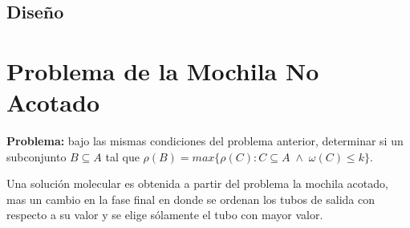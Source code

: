 \documentclass[12pt, letterpaper, twoside]{article}
\begin{document}
    \begin{algorithm}
        \begin{algorithmic}[1]
            \EndFor
            \EndFor
            \EndProcedure
        \end{algorithmic}
    \end{algorithm}
    \newpage
    \subsection{Diseño}
    \newpage
    \section{Problema de la Mochila No Acotado}
    \textbf{Problema:} bajo las mismas condiciones del problema anterior, determinar si un subconjunto $B\subseteq A$ tal que $\rho(B) =max\{\rho(C):C\subseteq A\;\land\;\omega(C) \leq k\}$.


    Una solución molecular es obtenida a partir del problema la mochila acotado, mas un cambio en la fase final en donde se ordenan los tubos de salida con respecto a su valor y se elige sólamente el tubo con mayor valor.
\end{document}
